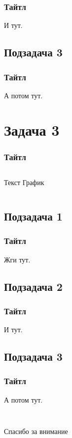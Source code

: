 \documentclass[10pt,pdf,aspectratio=169]{beamer}
\begin{document}
\begin{frame}
  \frametitle{Тайтл}   %
  И тут.
\end{frame}


\subsection{Подзадача 3}

\begin{frame}
  \frametitle{Тайтл}   %
  А потом тут.
\end{frame}


\section{Задача 3}

\begin{frame}
  \frametitle{Тайтл}   %
  \begin{columns}[c]
  \column{2in}  %
    Текст
  \column{3in}
  График
  \end{columns}
\end{frame}

\subsection{Подзадача 1}

\begin{frame}
  \frametitle{Тайтл}   %
  Жги тут.
\end{frame}

\subsection{Подзадача 2}

\begin{frame}
  \frametitle{Тайтл}   %
  И тут.
\end{frame}


\subsection{Подзадача 3}

\begin{frame}
  \frametitle{Тайтл}   %
  А потом тут.
\end{frame}


\subsection{}
\begin{frame}
  \frametitle{}   %
   \begin{columns}[c]
   \column{1.3in}
  Спасибо за внимание
  \end{columns}
\end{frame}
\end{document}
